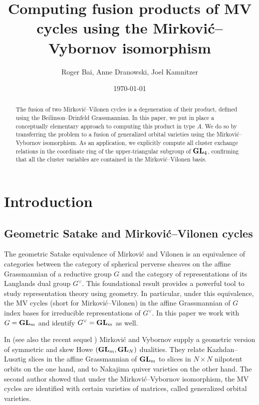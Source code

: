 \documentclass{article}
\title{Computing fusion products of MV cycles using the Mirkovi\'c--Vybornov isomorphism}
\author{Roger Bai, Anne Dranowski, Joel Kamnitzer}
\date{\today}
\begin{document}
\maketitle
\begin{abstract}
    The fusion of two Mirkovi\'c--Vilonen cycles is a degeneration of their product, defined using the Beilinson--Drinfeld Grassmannian.  In this paper, we put in place a conceptually elementary approach to computing this product in type $A$.  We do so by transferring the problem to a fusion of generalized orbital varieties using the Mirkovi\'c--Vybornov isomorphism.  As an application, we explicitly compute all cluster exchange relations in the coordinate ring of the upper-triangular subgroup of $ {\mathbf{GL}}_4$, confirming that all the cluster variables are contained in the Mirkovi\'c--Vilonen basis.
\end{abstract}

\section{Introduction}
\label{s:intro}
% 
\subsection{Geometric Satake and Mirkovi\'c--Vilonen cycles}
\label{ss:gsmv}
% 
The geometric Satake equivalence of Mirkovi\'c and Vilonen \cite{mirkovic2007geometric} is an equivalence of categories between the category of spherical perverse sheaves on the affine Grassmannian of a reductive group $ G $ and the category of representations of its Langlands dual group $G^\vee$.  This foundational result provides a powerful tool to study representation theory using geometry.  In particular, under this equivalence, the MV cycles (short for Mirkovi\'c--Vilonen) in the affine Grassmannian of $ G $ index bases for irreducible representations of $ G^\vee $. In this paper we work with $ G = {\mathbf{GL}}_m$ and identify $ G^\vee = {\mathbf{GL}}_m$ as well.

In \cite{mirkovic2007quiver} (see also the recent sequel \cite{mirkovic2019comparison}) Mirkovi\'c and Vybornov supply a geometric version of symmetric and skew Howe $({\mathbf{GL}}_m,{\mathbf{GL}}_N)$ dualities.  They relate Kazhdan--Lusztig slices in the affine Grassmannian of ${\mathbf{GL}}_m$ to slices in $N\times N$ nilpotent orbits on the one hand, and to Nakajima quiver varieties on the other hand.    The second author \cite{dthesis} showed  that under the Mirkovi\'c--Vybornov isomorphism, the MV cycles are identified with certain varieties of matrices, called generalized orbital varieties.
\end{document}
